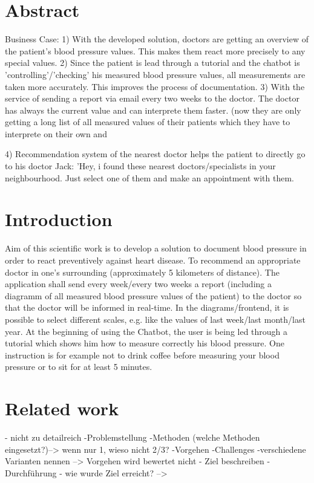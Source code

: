 




\chapter{Abstract}\label{abstract}

Business Case:
1) With the developed solution, doctors are getting an overview of the patient's blood pressure values. This makes them react more precisely to any special values. 
2) Since the patient is lead through a tutorial and the chatbot is 'controlling'/'checking' his measured blood pressure values, all measurements are taken more accurately. This improves the process of documentation.
3) With the service of sending a report via email every two weeks to the doctor. The doctor has always the current value and can interprete them faster. (now they are only getting a long list of all measured values of their patients which they have to interprete on their own and \begin{flushleft}
\end{flushleft}
4) Recommendation system of the nearest doctor helps the patient to directly go to his doctor 
Jack: 'Hey, i found these nearest doctors/specialists in your neighbourhood. Just select one of them and make an appointment with them. 

\chapter{Introduction}\label{introduction}

Aim of this scientific work is to develop a solution to document blood pressure in order to react preventively against heart disease.
To recommend an appropriate doctor in one's surrounding (approximately 5 kilometers of distance).
The application shall send every week/every two weeks a report (including a diagramm of all measured blood pressure values of the patient) to the doctor so that the doctor will be informed in real-time. In the diagrams/frontend, it is possible to select different scales, e.g. like the values of last week/last month/last year. 
At the beginning of using the Chatbot, the user is being led through a tutorial which shows him how to measure correctly his blood pressure. One instruction is for example not to drink coffee before measuring your blood pressure or to sit for at least 5 minutes.

\chapter{Related work}\label{related}
- nicht zu detailreich
-Problemstellung
-Methoden (welche Methoden eingesetzt?)--> wenn nur 1, wieso nicht 2/3?
-Vorgehen
-Challenges
-verschiedene Varianten nennen
--> Vorgehen wird bewertet nicht 
- Ziel beschreiben
- Durchführung
- wie wurde Ziel erreicht? --> 

